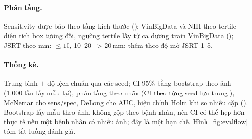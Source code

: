 \paragraph{Phân tầng.} Sensitivity được báo theo tầng kích thước (): VinBigData và NIH theo
tertile diện tích box tương đối, ngưỡng tertile lấy từ ca dương train VinBigData ();
JSRT theo mm: $\le 10$, 10--20, $> 20$\,mm; thêm theo độ mờ JSRT 1--5.

\paragraph{Thống kê.} Trung bình $\pm$ độ lệch chuẩn qua các seed; CI 95\% bằng bootstrap theo ảnh (1.000 lần lấy
mẫu lại), phân tầng theo nhãn (CI theo từng seed lưu trong ); McNemar cho sens/spec,
DeLong cho AUC, hiệu chỉnh Holm khi so nhiều cặp (). Bootstrap lấy mẫu theo ảnh, không gộp
theo bệnh nhân, nên CI có thể hẹp hơn thực tế nếu một bệnh nhân có nhiều ảnh; đây là một hạn chế.
Hình~\ref{fig:evalflow} tóm tắt luồng đánh giá.

